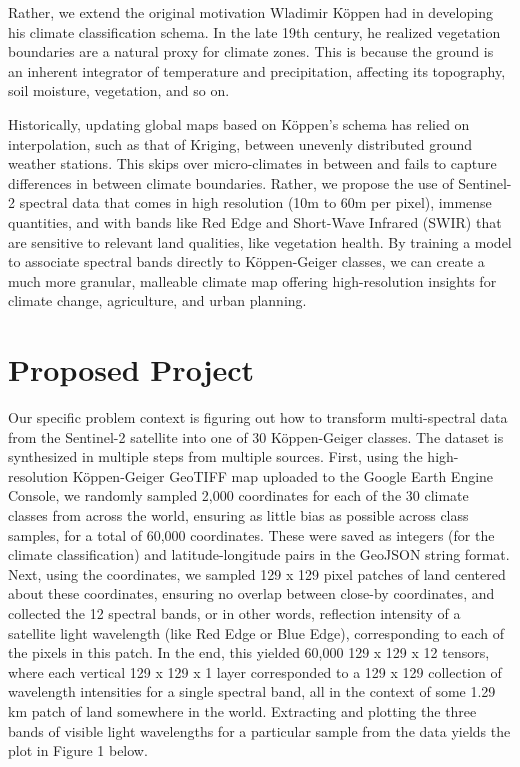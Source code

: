 \documentclass[12pt]{article}
\begin{document}
Rather, we extend the original motivation Wladimir Köppen had in developing his climate classification schema. In the late 19th century, he realized vegetation boundaries are a natural proxy for climate zones. This is because the ground is an inherent integrator of temperature and precipitation, affecting its topography, soil moisture, vegetation, and so on. 

Historically, updating global maps based on Köppen's schema has relied on interpolation, such as that of Kriging, between unevenly distributed ground weather stations. This skips over micro-climates in between and fails to capture differences in between climate boundaries. Rather, we propose the use of Sentinel-2 spectral data that comes in high resolution (10m to 60m per pixel), immense quantities, and with bands like Red Edge and Short-Wave Infrared (SWIR) that are sensitive to relevant land qualities, like vegetation health. By training a model to associate spectral bands directly to Köppen-Geiger classes, we can create a much more granular, malleable climate map offering high-resolution insights for climate change, agriculture, and urban planning.

\section{Proposed Project}
\label{sec:proposed-project}

\indent Our specific problem context is figuring out how to transform multi-spectral data from the Sentinel-2  satellite into one of 30 Köppen-Geiger classes. The dataset is synthesized in multiple steps from multiple sources. First, using the high-resolution Köppen-Geiger GeoTIFF map uploaded to the Google Earth Engine Console, we randomly sampled 2,000 coordinates for each of the 30 climate classes from across the world, ensuring as little bias as possible across class samples, for a total of 60,000 coordinates. These were saved as integers (for the climate classification) and latitude-longitude pairs in the GeoJSON string format. Next, using the coordinates, we sampled 129 x 129 pixel patches of land centered about these coordinates, ensuring no overlap between close-by coordinates, and collected the 12 spectral bands, or in other words, reflection intensity of a satellite light wavelength (like Red Edge or Blue Edge), corresponding to each of the pixels in this patch. In the end, this yielded 60,000 129 x 129 x 12 tensors, where each vertical 129 x 129 x 1 layer corresponded to a 129 x 129 collection of wavelength intensities for a single spectral band, all in the context of some 1.29 km patch of land somewhere in the world.
Extracting and plotting the three bands of visible light wavelengths for a particular sample from the data yields the plot in Figure 1 below.
\end{document}
